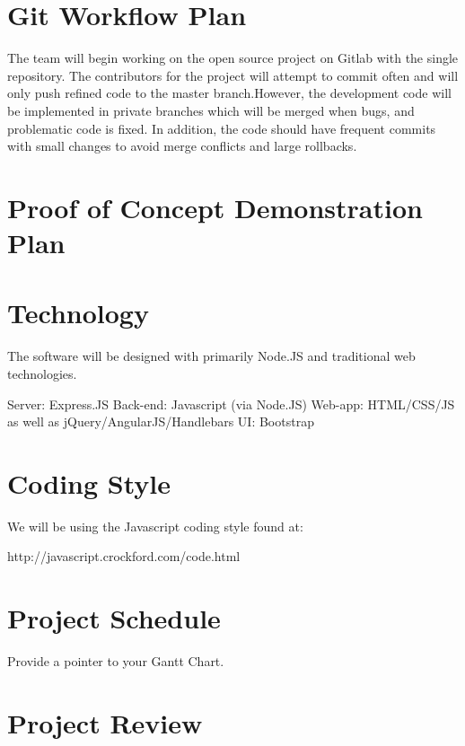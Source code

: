 \documentclass{article}
\begin{document}
\section{Git Workflow Plan}
The team will begin working on the open source project on Gitlab with the single repository. The contributors for the project will attempt to commit often and will only push refined code to the master branch.However, the development code will be implemented in private branches which will be merged when bugs, and problematic code is fixed. In addition, the code should have frequent commits with small changes to avoid merge conflicts and large rollbacks.
\section{Proof of Concept Demonstration Plan}

\section{Technology}
The software will be designed with primarily Node.JS and traditional web technologies.

Server: Express.JS
Back-end: Javascript (via Node.JS)
Web-app: HTML/CSS/JS as well as jQuery/AngularJS/Handlebars
UI: Bootstrap

\section{Coding Style}
We will be using the Javascript coding style found at:

http://javascript.crockford.com/code.html

\section{Project Schedule}
Provide a pointer to your Gantt Chart.

\section{Project Review}
\end{document}
